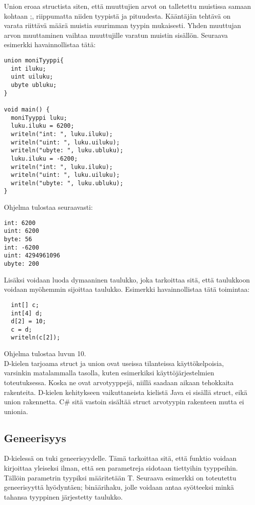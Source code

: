 \documentclass[11pt,oneside,a4paper]{article}
\begin{document}
Union eroaa structista siten, että muuttujien arvot on talletettu muistissa
samaan kohtaan \cite{ALE10};\cite{KRR88}, riippumatta niiden tyypistä ja
pituudesta. Kääntäjän tehtävä on varata riittävä määrä muistia suurimman tyypin
mukaisesti. Yhden muuttujan arvon muuttaminen vaihtaa muuttujille varatun
muistin sisällön. Seuraava esimerkki havainnollistaa tätä:
\begin{verbatim}
union moniTyyppi{
  int iluku;
  uint uiluku;
  ubyte ubluku;
}

void main() {
  moniTyyppi luku;
  luku.iluku = 6200;
  writeln("int: ", luku.iluku);
  writeln("uint: ", luku.uiluku);
  writeln("ubyte: ", luku.ubluku);
  luku.iluku = -6200;
  writeln("int: ", luku.iluku);
  writeln("uint: ", luku.uiluku);
  writeln("ubyte: ", luku.ubluku);
}
\end{verbatim}
Ohjelma tulostaa seuraavasti:

\begin{verbatim}
int: 6200
uint: 6200
byte: 56
int: -6200
uint: 4294961096
ubyte: 200
\end{verbatim}

Lisäksi voidaan luoda dymaaninen taulukko, joka tarkoittaa sitä, että taulukkoon
voidaan myöhemmin sijoittaa taulukko. Esimerkki havainnollistaa tätä toimintaa:

\begin{verbatim}
  int[] c;
  int[4] d;
  d[2] = 10;
  c = d;
  writeln(c[2]);
\end{verbatim}
Ohjelma tulostaa luvun 10. \\

D-kielen tarjoama struct ja union ovat useissa tilanteissa käyttökelpoisia,
varsinkin matalammalla tasolla, kuten esimerkiksi käyttöjärjestelmien
toteutuksessa. Koska ne ovat arvotyyppejä, niillä saadaan aikaan tehokkaita
rakenteita. D-kielen kehitykseen vaikuttaneista kielistä Java ei sisällä struct,
eikä union rakennetta. C\# sitä vastoin sisältää struct arvotyypin rakenteen
mutta ei unionia.

\subsection{Geneerisyys}
D-kielessä on tuki geneerisyydelle. Tämä tarkoittaa sitä, että funktio voidaan
kirjoittaa yleiseksi ilman, että sen parametreja sidotaan tiettyihin tyyppeihin.
Tällöin parametrin tyypiksi määritetään T. Seuraava esimerkki on toteutettu
geneerisyyttä hyödyntäen; binäärihaku, jolle voidaan antaa syötteeksi minkä
tahansa tyyppinen järjestetty taulukko.
\end{document}
